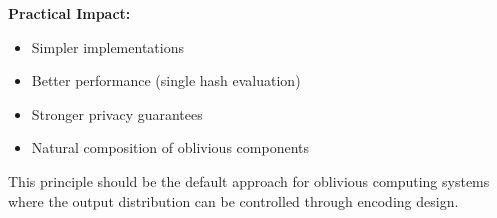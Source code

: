 \documentclass[11pt,final,hidelinks]{article}
\begin{document}
\textbf{Practical Impact:}
\begin{itemize}
    \item Simpler implementations
    \item Better performance (single hash evaluation)
    \item Stronger privacy guarantees
    \item Natural composition of oblivious components
\end{itemize}

This principle should be the default approach for oblivious computing systems where the output distribution can be controlled through encoding design.


\end{document}
